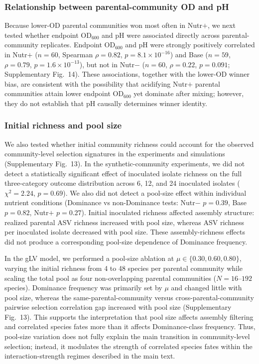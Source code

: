 \subsubsection*{Relationship between parental-community OD and pH}
Because lower-OD parental communities won most often in Nutr$+$, we next tested whether endpoint OD$_{600}$ and pH were associated directly across parental-community replicates. Endpoint OD$_{600}$ and pH were strongly positively correlated in Nutr$+$ ($n=60$, Spearman $\rho=0.82$, $p=8.1 \times 10^{-16}$) and Base ($n=59$, $\rho=0.79$, $p=1.6 \times 10^{-13}$), but not in Nutr$-$ ($n=60$, $\rho=0.22$, $p=0.091$; Supplementary Fig.~14). These associations, together with the lower-OD winner bias, are consistent with the possibility that acidifying Nutr$+$ parental communities attain lower endpoint OD$_{600}$ yet dominate after mixing; however, they do not establish that pH causally determines winner identity.

\subsubsection*{Initial richness and pool size}
We also tested whether initial community richness could account for the observed community-level selection signatures in the experiments and simulations (Supplementary Fig.~13). In the synthetic-community experiments, we did not detect a statistically significant effect of inoculated isolate richness on the full three-category outcome distribution across 6, 12, and 24 inoculated isolates ($\chi^2 = 2.24$, $p = 0.69$). We also did not detect a pool-size effect within individual nutrient conditions (Dominance vs non-Dominance tests: Nutr$-$ $p = 0.39$, Base $p = 0.82$, Nutr$+$ $p = 0.27$). Initial inoculated richness affected assembly structure: realized parental ASV richness increased with pool size, whereas ASV richness per inoculated isolate decreased with pool size. These assembly-richness effects did not produce a corresponding pool-size dependence of Dominance frequency.

In the gLV model, we performed a pool-size ablation at $\mu \in \{0.30, 0.60, 0.80\}$, varying the initial richness from 4 to 48 species per parental community while scaling the total pool as four non-overlapping parental communities ($N=16$--$192$ species). Dominance frequency was primarily set by $\mu$ and changed little with pool size, whereas the same-parental-community versus cross-parental-community pairwise selection correlation gap increased with pool size (Supplementary Fig.~13). This supports the interpretation that pool size affects assembly filtering and correlated species fates more than it affects Dominance-class frequency. Thus, pool-size variation does not fully explain the main transition in community-level selection; instead, it modulates the strength of correlated species fates within the interaction-strength regimes described in the main text.

